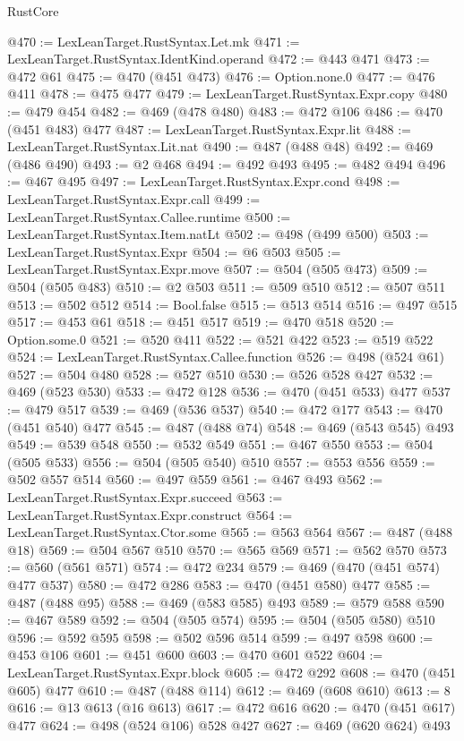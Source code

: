 \begin{lexlean}{RustCore}
\begin{coremodule}
@470 := LexLeanTarget.RustSyntax.Let.mk
@471 := LexLeanTarget.RustSyntax.IdentKind.operand
@472 := @443 @471
@473 := @472 @61
@475 := @470 (@451 @473)
@476 := Option.none.{0}
@477 := @476 @411
@478 := @475 @477
@479 := LexLeanTarget.RustSyntax.Expr.copy
@480 := @479 @454
@482 := @469 (@478 @480)
@483 := @472 @106
@486 := @470 (@451 @483) @477
@487 := LexLeanTarget.RustSyntax.Expr.lit
@488 := LexLeanTarget.RustSyntax.Lit.nat
@490 := @487 (@488 @48)
@492 := @469 (@486 @490)
@493 := @2 @468
@494 := @492 @493
@495 := @482 @494
@496 := @467 @495
@497 := LexLeanTarget.RustSyntax.Expr.cond
@498 := LexLeanTarget.RustSyntax.Expr.call
@499 := LexLeanTarget.RustSyntax.Callee.runtime
@500 := LexLeanTarget.RustSyntax.Item.natLt
@502 := @498 (@499 @500)
@503 := LexLeanTarget.RustSyntax.Expr
@504 := @6 @503
@505 := LexLeanTarget.RustSyntax.Expr.move
@507 := @504 (@505 @473)
@509 := @504 (@505 @483)
@510 := @2 @503
@511 := @509 @510
@512 := @507 @511
@513 := @502 @512
@514 := Bool.false
@515 := @513 @514
@516 := @497 @515
@517 := @453 @61
@518 := @451 @517
@519 := @470 @518
@520 := Option.some.{0}
@521 := @520 @411
@522 := @521 @422
@523 := @519 @522
@524 := LexLeanTarget.RustSyntax.Callee.function
@526 := @498 (@524 @61)
@527 := @504 @480
@528 := @527 @510
@530 := @526 @528 @427
@532 := @469 (@523 @530)
@533 := @472 @128
@536 := @470 (@451 @533) @477
@537 := @479 @517
@539 := @469 (@536 @537)
@540 := @472 @177
@543 := @470 (@451 @540) @477
@545 := @487 (@488 @74)
@548 := @469 (@543 @545) @493
@549 := @539 @548
@550 := @532 @549
@551 := @467 @550
@553 := @504 (@505 @533)
@556 := @504 (@505 @540) @510
@557 := @553 @556
@559 := @502 @557 @514
@560 := @497 @559
@561 := @467 @493
@562 := LexLeanTarget.RustSyntax.Expr.succeed
@563 := LexLeanTarget.RustSyntax.Expr.construct
@564 := LexLeanTarget.RustSyntax.Ctor.some
@565 := @563 @564
@567 := @487 (@488 @18)
@569 := @504 @567 @510
@570 := @565 @569
@571 := @562 @570
@573 := @560 (@561 @571)
@574 := @472 @234
@579 := @469 (@470 (@451 @574) @477 @537)
@580 := @472 @286
@583 := @470 (@451 @580) @477
@585 := @487 (@488 @95)
@588 := @469 (@583 @585) @493
@589 := @579 @588
@590 := @467 @589
@592 := @504 (@505 @574)
@595 := @504 (@505 @580) @510
@596 := @592 @595
@598 := @502 @596 @514
@599 := @497 @598
@600 := @453 @106
@601 := @451 @600
@603 := @470 @601 @522
@604 := LexLeanTarget.RustSyntax.Expr.block
@605 := @472 @292
@608 := @470 (@451 @605) @477
@610 := @487 (@488 @114)
@612 := @469 (@608 @610)
@613 := 8
@616 := @13 @613 (@16 @613)
@617 := @472 @616
@620 := @470 (@451 @617) @477
@624 := @498 (@524 @106) @528 @427
@627 := @469 (@620 @624) @493

\end{coremodule}
\end{lexlean}
